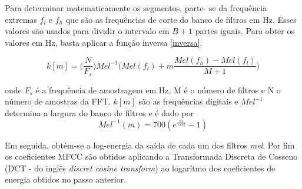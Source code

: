 Para determinar matematicamente os segmentos, parte- se da frequência extremas $f_l$ e $f_h$ que são as frequências de corte do banco de filtros em Hz. Esses valores são usados para dividir o intervalo em $B+1$ partes iguais. Para obter os valores em Hz, basta aplicar a função inversa \ref{inversa}.

\begin{equation}
\label{inversa}
k[m] = \big( \frac{N}{F_s}\big) Mel^{-1} \big(Mel(f_l) + m \frac{Mel(f_h)- Mel(f_l)}{M+1}\big)
\end{equation}

onde $F_s$ é a frequência de amostragem em Hz, M é o número de filtros e N o número de amostras da FFT. $k[m]$ são as frequências digitais e $Mel^{-1}$ determina a largura do banco de filtros e é dado por
\begin{equation}
Mel^{-1}(m) = 700(e^{\frac{m}{1125}} - 1)
\end{equation}



Em seguida, obtém-se a log-energia da saída de cada um dos filtros \textit{mel}. Por fim os coeficientes MFCC são obtidos aplicando a  Transformada Discreta de Cosseno (DCT - do inglês \textit{discret cosine transform}) ao logarítmo dos coeficientes de energia obtidos no passo anterior.





























